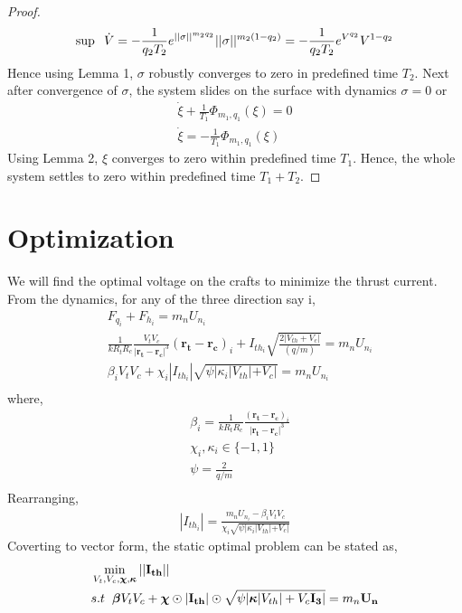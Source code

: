 \documentclass[]{article}
\theoremstyle{remark}
\theoremstyle{definition}
\begin{document}
\begin{proof}
\begin{align}
		\sup \hspace{2mm} \dot V = -\frac{1}{q_2T_2}e^{||\sigma||^{m_2q_2}}||\sigma||^{m_2(1-q_2)}  = -\frac{1}{q_2T_2}e^{V^{q_2}}V^{1-q_2}
	\end{align}
Hence using Lemma 1, $\sigma$ robustly converges to zero in predefined time $T_2$. \newline
Next after convergence of $\sigma$, the system slides on the surface with dynamics $\sigma =0$ or 
\begin{align}
\dot{\xi} + \frac{1}{T_1}\Phi_{m_1,q_1}(\xi) = 0 \\
\dot{\xi}  = -\frac{1}{T_1}\Phi_{m_1,q_1}(\xi)
\end{align}
Using Lemma 2, $ \xi $ converges to zero within predefined time $T_1$. \newline
Hence, the whole system settles to zero within predefined time $ T_1+T_2 $. 
\end{proof}
\section{Optimization}
We will find the optimal voltage on the crafts to minimize the thrust current.
From the dynamics, for any of the three direction  say i,  
\begin{align}
	&F_{q_i} + F_{h_i} = m_nU_{n_i} \\
	&\frac{1}{kR_t R_c}\frac{V_t V_c}{| \mathbf{r_t-r_c}|^3}(\mathbf{r_t-r_c})_i + I_{{th}_i}\sqrt{\frac{2|V_{th}+V_c|}{(q/m)}}  =  m_nU_{n_i} \\
	&\beta_i V_tV_c + \chi_i |I_{{th}_i}|\sqrt{\psi |\kappa_i|V_{th}|+V_c|} = m_nU_{n_i} \\
\end{align}
where,
\begin{align}
	&\beta_i = \frac{1}{kR_t R_c}\frac{(\mathbf{r_t-r_c})_i}{| \mathbf{r_t-r_c}|^3} \\
	&\chi_i, \kappa_i \in \{-1,1\} \\
	&\psi = \frac{2}{q/m} \\
\end{align}
Rearranging,
\begin{align}
	|I_{{th}_i}| = \frac{m_nU_{n_i}-\beta_i V_tV_c}{\chi_i\sqrt{\psi |\kappa_i|V_{th}|+V_c|}}
\end{align}
Coverting to vector form, the static optimal problem can be stated as,
\begin{align}
&\min_{V_t,V_c,\boldsymbol{\chi},\boldsymbol{\kappa}} ||\mathbf{I_{{th}}}|| \\
&s.t \hspace{2mm}  \boldsymbol{\beta}V_tV_c + \boldsymbol{\chi}\odot|\mathbf{I_{{th}}}|\odot\sqrt{\psi |\boldsymbol{\kappa}|V_{th}|+V_c\mathbf{I_{3}}|} = m_n\mathbf{U_{n}}	
\end{align}
\end{document}
